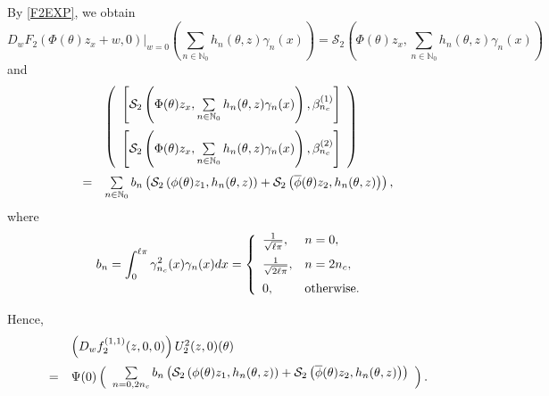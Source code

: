 \documentclass[11pt]{article}
\theoremstyle{definition}
\theoremstyle{remark}
\numberwithin{equation}{section}
\begin{document}
By \eqref{F2EXP}, we obtain
$$\left.D_w F_2\left(\Phi(\theta) z_x+w, 0\right)\right|_{w=0}\left(\sum\limits_{n\in \mathbb{N}_0}  h_n(\theta,z) \gamma_n(x)\right)= \mathcal{S}_2\left(\Phi(\theta) z_x, \sum\limits_{n\in \mathbb{N}_0}  h_n(\theta,z) \gamma_n(x)\right) $$
and
$$
\begin{array}{lll}
&&\left(\begin{array}{c}
                        \left[\mathcal{S}_2\left(\Phi(\theta) z_x, \sum\limits_{n\in \mathbb{N}_0}  h_n(\theta,z) \gamma_n(x)\right), \beta_{n_c}^{(1)}\right] \vspace{0.2cm}\\
  \left[\mathcal{S}_2\left(\Phi(\theta)  z_x, \sum\limits_{n\in \mathbb{N}_0}  h_n(\theta,z) \gamma_n(x)\right), \beta_{n_c}^{(2)}\right]
                         \end{array}
\right)\vspace{0.2cm}\\
&=&\sum\limits_{n\in \mathbb{N}_0} b_n\left(\mathcal{S}_2\left(\phi (\theta) z_1,h_n(\theta, z)\right)+\mathcal{S}_2\left(\overline{\phi }(\theta) z_2,h_n(\theta, z)\right)\right),
\end{array}
$$
where
\begin{equation}
\label{BN}
b_n=\int_0^{\ell\pi}\gamma^2_{n_c}(x)\gamma_n(x) dx=\left\{\begin{array}{ll}
\frac{1}{\sqrt{\ell\pi}}, & n=0,      \vspace{0.2cm}\\
\frac{1}{\sqrt{2\ell\pi}}, & n=2n_c,    \vspace{0.2cm}\\
 0, & \mbox{otherwise}.
 \end{array}
\right.
\end{equation}

Hence,
$$
\begin{array}{lll}
&&\left(D_wf_2^{(1,1)}(z, 0,
0)\right)U^2_2(z,0)(\theta)\vspace{0.2cm}\\
&=&\Psi(0)\left(
\begin{array}{l}
\sum\limits_{n=0, 2n_c} b_n\left(\mathcal{S}_2\left(\phi (\theta) z_1,h_n(\theta, z)\right)+\mathcal{S}_2\left(\overline{\phi }(\theta) z_2,h_n(\theta, z)\right)\right)
\end{array}
\right).
\end{array}
$$
\end{document}
